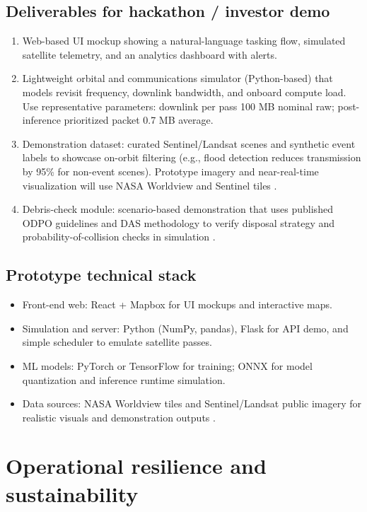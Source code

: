 \subsection{Deliverables for hackathon / investor demo}
\begin{enumerate}
  \item Web-based UI mockup showing a natural-language tasking flow, simulated satellite telemetry, and an analytics dashboard with alerts.
  \item Lightweight orbital and communications simulator (Python-based) that models revisit frequency, downlink bandwidth, and onboard compute load. Use representative parameters: downlink per pass \num{100} MB nominal raw; post-inference prioritized packet \num{0.7} MB average.
  \item Demonstration dataset: curated Sentinel/Landsat scenes and synthetic event labels to showcase on-orbit filtering (e.g., flood detection reduces transmission by \num{95}\% for non-event scenes). Prototype imagery and near-real-time visualization will use NASA Worldview and Sentinel tiles \parencite{worldview,copernicus,earthexplorer,nasaopendata}.
  \item Debris-check module: scenario-based demonstration that uses published ODPO guidelines and DAS methodology to verify disposal strategy and probability-of-collision checks in simulation \parencite{odpo,das}.
\end{enumerate}

\subsection{Prototype technical stack}
\begin{itemize}
  \item Front-end web: React + Mapbox for UI mockups and interactive maps.
  \item Simulation and server: Python (NumPy, pandas), Flask for API demo, and simple scheduler to emulate satellite passes.
  \item ML models: PyTorch or TensorFlow for training; ONNX for model quantization and inference runtime simulation.
  \item Data sources: NASA Worldview tiles and Sentinel/Landsat public imagery for realistic visuals and demonstration outputs \parencite{worldview,copernicus,earthexplorer}.
\end{itemize}

\section{Operational resilience and sustainability}
